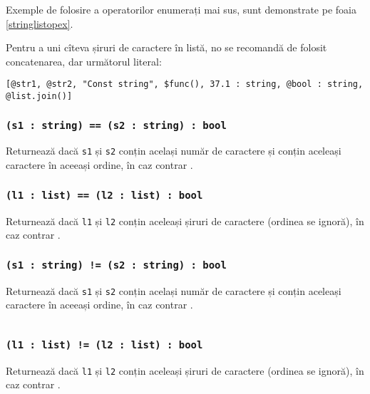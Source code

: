 Exemple de folosire a operatorilor enumerați mai sus, sunt demonstrate pe foaia \ref{stringlistopex}.

Pentru a uni cîteva șiruri de caractere în listă, no se recomandă de folosit concatenarea, dar următorul literal:
\begin{verbatim}
[@str1, @str2, "Const string", $func(), 37.1 : string, @bool : string, @list.join()]
\end{verbatim}

\subsubsection{\texttt{(s1 : string) == (s2 : string) : bool}}

Returnează \true{} dacă \texttt{s1} și \texttt{s2} conțin același număr de caractere și conțin aceleași caractere în aceeași ordine, în caz contrar \false{}.

\subsubsection{\texttt{(l1 : list) == (l2 : list) : bool}}

Returnează \true{} dacă \texttt{l1} și \texttt{l2} conțin aceleași șiruri de caractere (ordinea se ignoră), în caz contrar \false{}.

\subsubsection{\texttt{(s1 : string) != (s2 : string) : bool}}

Returnează \false{} dacă \texttt{s1} și \texttt{s2} conțin același număr de caractere și conțin aceleași caractere în aceeași ordine, în caz contrar \true{}.

\begin{sourcecode}
    \label{stringlistopex}
    \inputminted[linenos]{icl}{../sources/stringlistopex.icL}
\end{sourcecode}

\subsubsection{\texttt{(l1 : list) != (l2 : list) : bool}}

Returnează \false{} dacă \texttt{l1} și \texttt{l2} conțin aceleași șiruri de caractere (ordinea se ignoră), în caz contrar \true{}.

